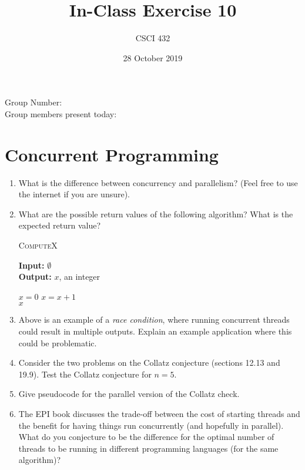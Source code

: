 \documentclass{article}
\title{In-Class Exercise 10}
\author{CSCI 432}
\date{28 October 2019}
\begin{document}
\maketitle

\noindent
Group Number:\\
Group members present today:

\section*{Concurrent Programming}

\begin{enumerate}
    \item What is the difference between concurrency and parallelism? (Feel
        free to use the internet if you are unsure).
        \vspace{1in}


    \item What are the possible return values of the following algorithm?  What
        is the expected return value?
        \begin{algorithm}\caption{\textsc{ComputeX}}
                {\bf Input:} $\emptyset$\\
                {\bf Output:} $x$, an integer
            \begin{algorithmic}[1]
                \State $x=0$
                \State $x=x+1$
                \EndFor\\
                \Return $x$
            \end{algorithmic}
        \end{algorithm}
        \vspace{1in}

    \item Above is an  example of a \emph{race condition},
        where running concurrent
        threads could result in multiple outputs.  Explain an example
        application where this could be problematic.
        \vspace{3in}

    \pagebreak
    \item Consider the two problems on the Collatz conjecture (sections 12.13
        and 19.9).  Test the Collatz conjecture for $n=5$.
        \vspace{1in}

    \item Give pseudocode for the parallel version of the Collatz check.
        \vspace{3in}

    \item The EPI book discusses the trade-off between the cost of starting
        threads and the benefit for having things run concurrently (and
        hopefully in parallel).  What do you conjecture to be the difference for
        the optimal number of threads to be running in different programming
        languages (for the same algorithm)?
\end{enumerate}
\end{document}
